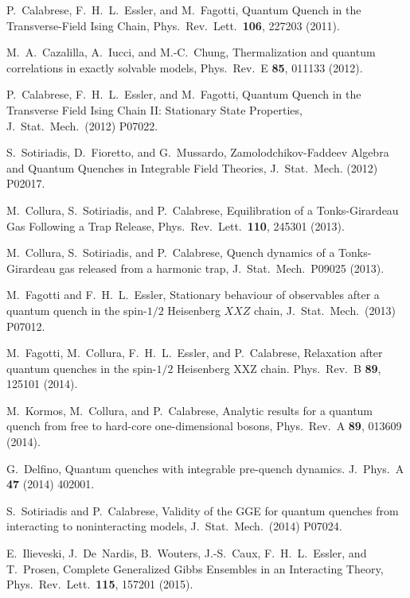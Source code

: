 \documentclass[twocolumn,superscriptaddress,prb,10pt]{revtex4-1}
\begin{document}
\begin{thebibliography}{99}
	P.~Calabrese, F.~H.~L.~Essler, and M.~Fagotti, 
	Quantum Quench in the Transverse-Field Ising Chain, 
	Phys.\ Rev.\ Lett.\ {\bf106}, 227203 (2011).


	M.~A.~Cazalilla, A.~Iucci, and M.-C.~Chung, 
	Thermalization and quantum correlations in exactly solvable models, 
	Phys.\ Rev.\ E {\bf 85},  011133 (2012).

	P.~Calabrese, F.~H.~L.~Essler, and M.~Fagotti, 
	Quantum Quench in the Transverse Field Ising Chain II: Stationary State Properties, 
	J.\ Stat.\ Mech.\ (2012) P07022.

	S.~Sotiriadis, D.~Fioretto, and G.~Mussardo, 
	Zamolodchikov-Faddeev Algebra and Quantum Quenches in Integrable Field Theories, 
	J.\ Stat.\ Mech. (2012) P02017.

	M.~Collura, S.~Sotiriadis, and P.~Calabrese, 
	Equilibration of a Tonks-Girardeau Gas Following a Trap Release, 
	Phys.\ Rev.\ Lett.\ {\bf 110}, 245301 (2013).

	M.~Collura, S.~Sotiriadis, and P.~Calabrese, 
	Quench dynamics of a Tonks-Girardeau gas released from a harmonic trap, 
	J.\ Stat.\ Mech.\ P09025 (2013).

	M.~Fagotti and F.~H.~L.~Essler,  Stationary behaviour of observables after
	a quantum quench in the spin-$1/2$ Heisenberg $XXZ$ chain, J.\ Stat.\ Mech.\ (2013) P07012.

	M.~Fagotti, M.~Collura, F.~H.~L.~Essler, and P.~Calabrese, 
	Relaxation after quantum quenches in the spin-$1/2$ Heisenberg XXZ chain.
	Phys.\ Rev.\ B  {\bf 89}, 125101 (2014).

	M.~Kormos, M.~Collura, and P.~Calabrese, 
	Analytic results for a quantum quench from free to hard-core one-dimensional bosons, 
	Phys.\ Rev.\ A {\bf 89}, 013609  (2014).

	G.~Delfino, Quantum quenches with integrable pre-quench dynamics.
	J.\ Phys.\ A {\bf 47} (2014) 402001.


	S.~Sotiriadis and P.~Calabrese, 
	Validity of the GGE for quantum quenches from interacting to noninteracting models, 
	J.\ Stat.\ Mech.\ (2014) P07024.

	E.~Ilieveski, J.~De~Nardis, B.~Wouters, J.-S.~Caux, F.~H.~L.~Essler, and T.~Prosen, 
	Complete Generalized Gibbs Ensembles in an Interacting Theory, 
	Phys.\ Rev.\ Lett.\ {\bf 115}, 157201 (2015).


\end{thebibliography}
\end{document}

